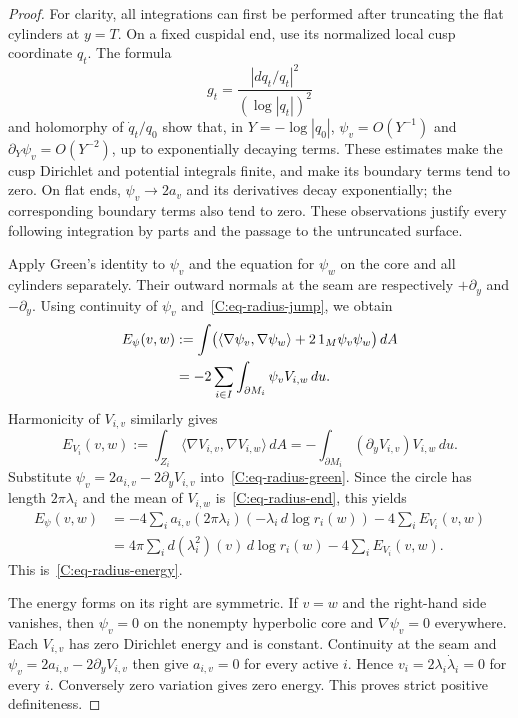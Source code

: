 \begin{proof}
For clarity, all integrations can first be performed after truncating the flat cylinders at $y=T$. On a fixed cuspidal end, use its normalized local cusp coordinate $q_t$. The formula
\[
 g_t=\frac{|dq_t/q_t|^2}{(\log|q_t|)^2}
\]
and holomorphy of $\dot q_t/q_0$ show that, in $Y=-\log|q_0|$,
$\psi_v=O(Y^{-1})$ and $\partial_Y\psi_v=O(Y^{-2})$, up to exponentially decaying terms. These estimates make the cusp Dirichlet and potential integrals finite, and make its boundary terms tend to zero. On flat ends, $\psi_v\to2a_v$ and its derivatives decay exponentially; the corresponding boundary terms also tend to zero. These observations justify every following integration by parts and the passage to the untruncated surface.

Apply Green's identity to $\psi_v$ and the equation for $\psi_w$ on the core and all cylinders separately. Their outward normals at the seam are respectively $+\partial_y$ and $-\partial_y$. Using continuity of $\psi_v$ and~\eqref{C:eq-radius-jump}, we obtain
\begin{align}
 E_\psi(v,w)&:=\int
 \bigl(\langle\nabla\psi_v,\nabla\psi_w\rangle
          +2\,1_M\psi_v\psi_w\bigr)\,dA\notag\\
 &=-2\sum_{i\in I}\int_{\partial M_i}\psi_v V_{i,w}\,du.
 \label{C:eq-radius-green}
\end{align}
Harmonicity of $V_{i,v}$ similarly gives
\[
 E_{V_i}(v,w):=\int_{Z_i}\langle\nabla V_{i,v},\nabla V_{i,w}\rangle\,dA
 =-\int_{\partial M_i}(\partial_y V_{i,v})V_{i,w}\,du.
\]
Substitute $\psi_v=2a_{i,v}-2\partial_yV_{i,v}$ into~\eqref{C:eq-radius-green}. Since the circle has length $2\pi\lambda_i$ and the mean of $V_{i,w}$ is~\eqref{C:eq-radius-end}, this yields
\begin{align*}
 E_\psi(v,w)
 &=-4\sum_i a_{i,v}(2\pi\lambda_i)
                  (-\lambda_i\,d\log r_i(w))
       -4\sum_iE_{V_i}(v,w)\\
 &=4\pi\sum_i d(\lambda_i^2)(v)\,d\log r_i(w)
       -4\sum_iE_{V_i}(v,w).
\end{align*}
This is~\eqref{C:eq-radius-energy}.

The energy forms on its right are symmetric. If $v=w$ and the right-hand side vanishes, then $\psi_v=0$ on the nonempty hyperbolic core and $\nabla\psi_v=0$ everywhere. Each $V_{i,v}$ has zero Dirichlet energy and is constant. Continuity at the seam and $\psi_v=2a_{i,v}-2\partial_yV_{i,v}$ then give $a_{i,v}=0$ for every active $i$. Hence $v_i=2\lambda_i\dot\lambda_i=0$ for every $i$. Conversely zero variation gives zero energy. This proves strict positive definiteness.
\end{proof}


